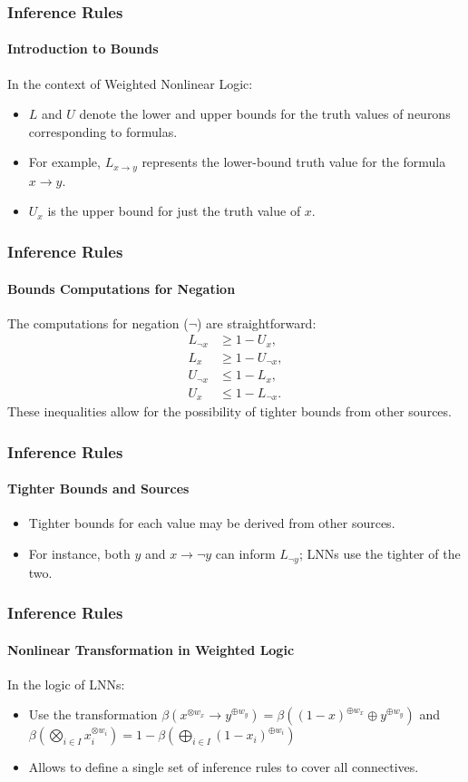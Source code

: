 \documentclass{beamer}
\begin{document}
\begin{frame}
\frametitle{Inference Rules}
\framesubtitle{Introduction to Bounds}
In the context of Weighted Nonlinear Logic:
\begin{itemize}
\item \(L\) and \(U\) denote the lower and upper bounds for the
  truth values of neurons corresponding to formulas.
\item For example, \(L_{x \rightarrow y}\) represents the lower-bound
  truth value for the formula \(x \rightarrow y\).
\item \(U_x\) is the upper bound for just the truth value of \(x\).
\end{itemize}
\end{frame}

\begin{frame}
\frametitle{Inference Rules}
\framesubtitle{Bounds Computations for Negation}
The computations for negation (\(\neg\)) are straightforward:
\begin{align*}
L_{\neg x} & \geq 1 - U_x, \\
L_x & \geq 1 - U_{\neg x}, \\
U_{\neg x} & \leq 1 - L_x, \\
U_x & \leq 1 - L_{\neg x}.
\end{align*}
These inequalities allow for the possibility of tighter bounds from
other sources.
\end{frame}

\begin{frame}
\frametitle{Inference Rules}
\framesubtitle{Tighter Bounds and Sources}
\begin{itemize}
\item Tighter bounds for each value may be derived from other sources.
\item For instance, both \(y\) and \(x \rightarrow \neg y\) can inform
  \(L_{\neg y}\); LNNs use the tighter of the two.
\end{itemize}
\end{frame}

\begin{frame}
\frametitle{Inference Rules}
\framesubtitle{Nonlinear Transformation in Weighted Logic}
In the logic of LNNs:
\begin{itemize}
    \item Use the transformation \(\beta (x^{ \otimes w_x} \rightarrow
      y^{\oplus w_y}) = \beta ((1 - x)^{ \oplus w_x} \oplus y^{ \oplus
        w_y})\) and $\beta \left( \bigotimes_{i \in I} x_i^{\otimes w_i} \right) = 1 - \beta \left( \bigoplus_{i \in I} (1 - x_i)^{\oplus w_i} \right)$

    \item Allows to define a single set of inference rules to cover
      all connectives.
\end{itemize}
\end{frame}
\end{document}
